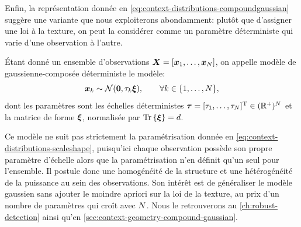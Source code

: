 Enfin, la représentation donnée en \cref{eq:context-distributions-compoundgaussian} suggère une variante que nous exploiterons abondamment: plutôt que d'assigner une loi à la texture, on peut la considérer comme un paramètre déterministe qui varie d'une observation à l'autre.

\begin{definition}
\label{def:context-distributions-detcompoundgaussian}
  \'Etant donné un ensemble d'observations $\boldsymbol{X}=[\boldsymbol{x}_1,\dots,\boldsymbol{x}_N]$, on appelle modèle de gaussienne-composée déterministe le modèle:
\begin{equation}
  \boldsymbol{x}_k \sim \mathcal{N}(\boldsymbol{0}, \tau_k\boldsymbol{\xi}),
  \qquad
  \forall k\in\{1,\dots,N\},
  \label{eq:context-distributions-detcompoundgaussian}
\end{equation}
  dont les paramètres sont les échelles déterministes $\boldsymbol{\tau}=[\tau_1,\dots,\tau_N]^{\mathrm{T}}\in(\mathbb{R}^+)^N$ et la matrice de forme $\boldsymbol{\xi}$, normalisée par $\operatorname{\operatorname{Tr}}\left\{\boldsymbol{\xi}\right\}=d$.
\end{definition}

\begin{remark}
  Ce modèle ne suit pas strictement la paramétrisation donnée en \cref{eq:context-distributions-scaleshape}, puisqu'ici chaque observation possède son propre paramètre d'échelle alors que la paramétrisation n'en définit qu'un seul pour l'ensemble. Il postule donc une homogénéité de la structure et une hétérogénéité de la puissance au sein des observations. Son intérêt est de généraliser le modèle gaussien sans ajouter le moindre apriori sur la loi de la texture, au prix d'un nombre de paramètres qui croît avec $N$. Nous le retrouverons au \cref{ch:robust-detection} ainsi qu'en \cref{sec:context-geometry-compound-gaussian}.
\end{remark}



